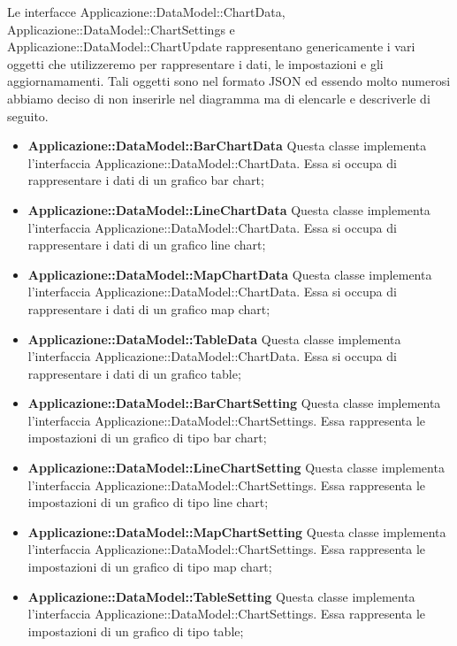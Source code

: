 	Le interfacce Applicazione::DataModel::ChartData, Applicazione::DataModel::ChartSettings e Applicazione::DataModel::ChartUpdate rappresentano genericamente i vari oggetti che utilizzeremo per rappresentare i dati, le impostazioni e gli aggiornamamenti. Tali oggetti sono nel formato JSON ed essendo molto numerosi abbiamo deciso di non inserirle nel diagramma ma di elencarle e descriverle di seguito.

	\begin{itemize}
		\item \textbf{Applicazione::DataModel::BarChartData} Questa classe implementa l'interfaccia Applicazione::DataModel::ChartData. Essa si occupa di rappresentare i dati di un grafico bar chart;

		\item \textbf{Applicazione::DataModel::LineChartData} Questa classe implementa l'interfaccia Applicazione::DataModel::ChartData. Essa si occupa di rappresentare i dati di un grafico line chart;

		\item \textbf{Applicazione::DataModel::MapChartData} Questa classe implementa l'interfaccia Applicazione::DataModel::ChartData. Essa si occupa di rappresentare i dati di un grafico map chart;

		\item \textbf{Applicazione::DataModel::TableData} Questa classe implementa l'interfaccia Applicazione::DataModel::ChartData. Essa si occupa di rappresentare i dati di un grafico table;

		\item \textbf{Applicazione::DataModel::BarChartSetting} Questa classe implementa l'interfaccia Applicazione::DataModel::ChartSettings. Essa rappresenta le impostazioni di un grafico di tipo bar chart;

		\item \textbf{Applicazione::DataModel::LineChartSetting} Questa classe implementa l'interfaccia Applicazione::DataModel::ChartSettings. Essa rappresenta le impostazioni di un grafico di tipo line chart;

		\item \textbf{Applicazione::DataModel::MapChartSetting} Questa classe implementa l'interfaccia Applicazione::DataModel::ChartSettings. Essa rappresenta le impostazioni di un grafico di tipo map chart;

		\item \textbf{Applicazione::DataModel::TableSetting} Questa classe implementa l'interfaccia Applicazione::DataModel::ChartSettings. Essa rappresenta le impostazioni di un grafico di tipo table;


\end{itemize}
